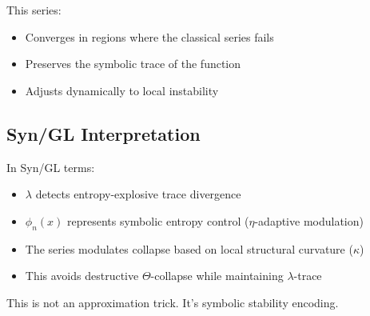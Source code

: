 This series:
\begin{itemize}
\item Converges in regions where the classical series fails
\item Preserves the symbolic trace of the function
\item Adjusts dynamically to local instability
\end{itemize}



\subsection{Syn/GL Interpretation}

In Syn/GL terms:
\begin{itemize}
\item $\lambda$ detects entropy-explosive trace divergence
\item $\phi_n(x)$ represents symbolic entropy control ($\eta$-adaptive modulation)
\item The series modulates collapse based on local structural curvature ($\kappa$)
\item This avoids destructive $\Theta$-collapse while maintaining $\lambda$-trace
\end{itemize}

This is not an approximation trick. It’s symbolic stability encoding.

